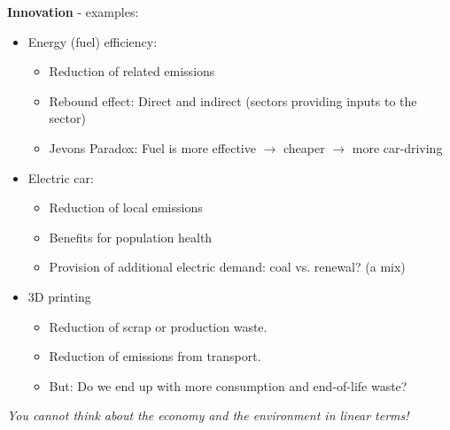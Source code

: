 \begin{multicols}{2}\noindent
\textbf{Innovation} - examples:
\begin{itemize}
  \item Energy (fuel) efficiency:
  \begin{itemize}
    \item Reduction of related emissions
    \item Rebound effect: Direct and indirect (sectors providing inputs to the sector)
    \item Jevons Paradox: Fuel is more effective $\rightarrow$ cheaper $\rightarrow$ more car-driving
  \end{itemize}
  \item Electric car:
  \begin{itemize}
    \item Reduction of local emissions
    \item Benefits for population health
    \item Provision of additional electric demand: coal vs. renewal? (a mix)
  \end{itemize}
  \item 3D printing
  \begin{itemize}
    \item Reduction of scrap or production waste.
    \item Reduction of emissions from transport.
    \item But: Do we end up with more consumption and end-of-life waste?
  \end{itemize}
\end{itemize}
\textit{You cannot think about the economy and the environment in linear terms!}
\end{multicols}
